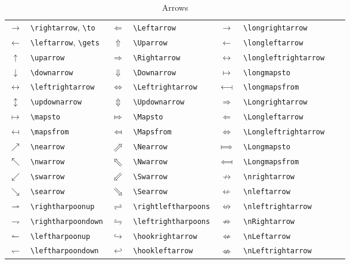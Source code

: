 \documentclass[captions=tableheading]{scrartcl}
\begin{document}
\begin{table}
  \caption{Arrows}
  \label{tab:equal-and-related}
  \centering
  \begin{tabular}[c]{clclclcl}
    \toprule
    $\rightarrow$ & \verb|\rightarrow|, \verb|\to| &
    $\Leftarrow$ & \verb|\Leftarrow| &
    $\longrightarrow$ & \verb|\longrightarrow| \\
    $\leftarrow$ & \verb|\leftarrow|, \verb|\gets| &
    $\Uparrow$ & \verb|\Uparrow| &
    $\longleftarrow$ & \verb|\longleftarrow| \\
    $\uparrow$ & \verb|\uparrow| &
    $\Rightarrow$ & \verb|\Rightarrow| &
    $\longleftrightarrow$ & \verb|\longleftrightarrow| \\
    $\downarrow$ & \verb|\downarrow| &
    $\Downarrow$ & \verb|\Downarrow| &
    $\longmapsto$ & \verb|\longmapsto| \\
    \addlinespace
    $\leftrightarrow$ & \verb|\leftrightarrow| &
    $\Leftrightarrow$ & \verb|\Leftrightarrow| &
    $\longmapsfrom$ & \verb|\longmapsfrom| \\
    $\updownarrow$ & \verb|\updownarrow| &
    $\Updownarrow$ & \verb|\Updownarrow| &
    $\Longrightarrow$ & \verb|\Longrightarrow| \\
    $\mapsto$ & \verb|\mapsto| &
    $\Mapsto$ & \verb|\Mapsto| &
    $\Longleftarrow$ & \verb|\Longleftarrow| \\
    $\mapsfrom$ & \verb|\mapsfrom| &
    $\Mapsfrom$ & \verb|\Mapsfrom| &
    $\Longleftrightarrow$ & \verb|\Longleftrightarrow| \\
    \addlinespace
    $\nearrow$ & \verb|\nearrow| &
    $\Nearrow$ & \verb|\Nearrow| &
    $\Longmapsto$ & \verb|\Longmapsto| \\
    $\nwarrow$ & \verb|\nwarrow| &
    $\Nwarrow$ & \verb|\Nwarrow| &
    $\Longmapsfrom$ & \verb|\Longmapsfrom| \\
    $\swarrow$ & \verb|\swarrow| &
    $\Swarrow$ & \verb|\Swarrow| &
    $\nrightarrow$ & \verb|\nrightarrow| \\
    $\searrow$ & \verb|\searrow| &
    $\Searrow$ & \verb|\Searrow| &
    $\nleftarrow$ & \verb|\nleftarrow| \\
    \addlinespace
    $\rightharpoonup$ & \verb|\rightharpoonup| &
    $\rightleftharpoons$ & \verb|\rightleftharpoons| &
    $\nleftrightarrow$ & \verb|\nleftrightarrow| \\
    $\rightharpoondown$ & \verb|\rightharpoondown| &
    $\leftrightharpoons$ & \verb|\leftrightharpoons| &
    $\nRightarrow$ & \verb|\nRightarrow| \\
    $\leftharpoonup$ & \verb|\leftharpoonup| &
    $\hookrightarrow$ & \verb|\hookrightarrow| &
    $\nLeftarrow$ & \verb|\nLeftarrow| \\
    $\leftharpoondown$ & \verb|\leftharpoondown| &
    $\hookleftarrow$ & \verb|\hookleftarrow| &
    $\nLeftrightarrow$ & \verb|\nLeftrightarrow| \\
    \bottomrule
  \end{tabular}
\end{table}
\end{document}

